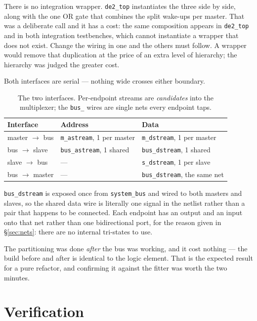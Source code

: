 \documentclass[11pt,a4paper]{article}
\newcommand{\sig}[1]{\texttt{#1}}
\begin{document}
There is no integration wrapper. \sig{de2\_top} instantiates the three side by
side, along with the one OR gate that combines the split wake-ups per master.
That was a deliberate call and it has a cost: the same composition appears in
\sig{de2\_top} and in both integration testbenches, which cannot instantiate a
wrapper that does not exist. Change the wiring in one and the others must
follow. A wrapper would remove that duplication at the price of an extra level
of hierarchy; the hierarchy was judged the greater cost.

Both interfaces are serial --- nothing wide crosses either boundary.

\begin{table}[htb]
\centering\small
\caption{The two interfaces. Per-endpoint streams are \emph{candidates} into
the multiplexer; the \sig{bus\_} wires are single nets every endpoint taps.}
\begin{tabular}{@{}lll@{}}
\toprule
\textbf{Interface} & \textbf{Address} & \textbf{Data}\\
\midrule
master $\rightarrow$ bus & \sig{m\_astream}, 1 per master & \sig{m\_dstream}, 1 per master\\
bus $\rightarrow$ slave  & \sig{bus\_astream}, 1 shared   & \sig{bus\_dstream}, 1 shared\\
slave $\rightarrow$ bus  & ---                            & \sig{s\_dstream}, 1 per slave\\
bus $\rightarrow$ master & ---                            & \sig{bus\_dstream}, the same net\\
\bottomrule
\end{tabular}
\end{table}

\sig{bus\_dstream} is exposed once from \sig{system\_bus} and wired to both
masters and slaves, so the shared data wire is literally one signal in the
netlist rather than a pair that happens to be connected. Each endpoint has an
output and an input onto that net rather than one bidirectional port, for the
reason given in \S\ref{sec:nets}: there are no internal tri-states to use.

The partitioning was done \emph{after} the bus was working, and it cost
nothing --- the build before and after is identical to the logic element.
That is the expected result for a pure refactor, and confirming it against
the fitter was worth the two minutes.

\section{Verification}
\label{sec:verif}
\end{document}
